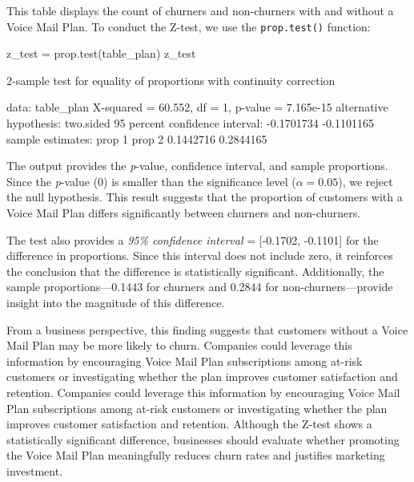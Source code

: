 \documentclass[
  11pt,
]{book}
\makeatletter
\newenvironment{Shaded}{}{}
\newcommand{\ControlFlowTok}[1]{\textcolor[rgb]{0.07,0.07,0.07}{#1}}
\newcommand{\DecValTok}[1]{#1}
\newcommand{\FloatTok}[1]{#1}
\newcommand{\FunctionTok}[1]{#1}
\newcommand{\NormalTok}[1]{#1}
\newcommand{\OtherTok}[1]{\textcolor[rgb]{0.39,0.39,0.39}{#1}}
\newcommand{\SpecialCharTok}[1]{\textcolor[rgb]{0.39,0.39,0.39}{#1}}
\newenvironment{kframe}{%
\medskip{}
\setlength{\fboxsep}{.8em}
 \def\at@end@of@kframe{}%
 \ifinner\ifhmode%
  \def\at@end@of@kframe{\end{minipage}}%
  \begin{minipage}{\columnwidth}%
 \fi\fi%
 \def\FrameCommand##1{\hskip\@totalleftmargin \hskip-\fboxsep
 \colorbox{shadecolor}{##1}\hskip-\fboxsep
     \hskip-\linewidth \hskip-\@totalleftmargin \hskip\columnwidth}%
 \MakeFramed {\advance\hsize-\width
   \@totalleftmargin\z@ \linewidth\hsize
   \@setminipage}}%
 {\par\unskip\endMakeFramed%
 \at@end@of@kframe}
\renewenvironment{Shaded}{\begin{kframe}}{\end{kframe}}
\theoremstyle{definition}
\theoremstyle{definition}
\theoremstyle{definition}
\theoremstyle{definition}
\theoremstyle{remark}
\makeatother
\begin{document}
This table displays the count of churners and non-churners with and without a Voice Mail Plan. To conduct the Z-test, we use the \texttt{prop.test()} function:

\begin{Shaded}
\begin{Highlighting}[]
\NormalTok{z\_test }\OtherTok{=} \FunctionTok{prop.test}\NormalTok{(table\_plan)}
\NormalTok{z\_test}
   
    \DecValTok{2}\SpecialCharTok{{-}}\NormalTok{sample test }\ControlFlowTok{for}\NormalTok{ equality of proportions with continuity correction}
   
\NormalTok{   data}\SpecialCharTok{:}\NormalTok{  table\_plan}
\NormalTok{   X}\SpecialCharTok{{-}}\NormalTok{squared }\OtherTok{=} \FloatTok{60.552}\NormalTok{, df }\OtherTok{=} \DecValTok{1}\NormalTok{, p}\SpecialCharTok{{-}}\NormalTok{value }\OtherTok{=} \FloatTok{7.165e{-}15}
\NormalTok{   alternative hypothesis}\SpecialCharTok{:}\NormalTok{ two.sided}
   \DecValTok{95}\NormalTok{ percent confidence interval}\SpecialCharTok{:}
    \SpecialCharTok{{-}}\FloatTok{0.1701734} \SpecialCharTok{{-}}\FloatTok{0.1101165}
\NormalTok{   sample estimates}\SpecialCharTok{:}
\NormalTok{      prop }\DecValTok{1}\NormalTok{    prop }\DecValTok{2} 
   \FloatTok{0.1442716} \FloatTok{0.2844165}
\end{Highlighting}
\end{Shaded}

The output provides the \emph{p}-value, confidence interval, and sample proportions. Since the \emph{p}-value (0) is smaller than the significance level (\(\alpha = 0.05\)), we reject the null hypothesis. This result suggests that the proportion of customers with a Voice Mail Plan differs significantly between churners and non-churners.

The test also provides a \emph{95\% confidence interval} = {[}-0.1702, -0.1101{]} for the difference in proportions. Since this interval does not include zero, it reinforces the conclusion that the difference is statistically significant. Additionally, the sample proportions---0.1443 for churners and 0.2844 for non-churners---provide insight into the magnitude of this difference.

From a business perspective, this finding suggests that customers without a Voice Mail Plan may be more likely to churn. Companies could leverage this information by encouraging Voice Mail Plan subscriptions among at-risk customers or investigating whether the plan improves customer satisfaction and retention. Companies could leverage this information by encouraging Voice Mail Plan subscriptions among at-risk customers or investigating whether the plan improves customer satisfaction and retention. Although the Z-test shows a statistically significant difference, businesses should evaluate whether promoting the Voice Mail Plan meaningfully reduces churn rates and justifies marketing investment.
\end{document}
